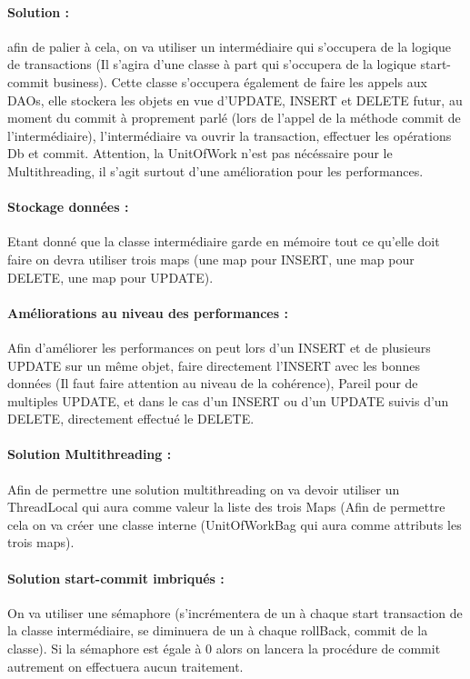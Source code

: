 \documentclass{article}[12pt]
\begin{document}
\paragraph{Solution : } afin de palier à cela, on va utiliser un intermédiaire qui s'occupera de la logique de transactions (Il s'agira d'une classe à part qui s'occupera de la logique start-commit business). Cette classe s'occupera également de faire les appels aux DAOs, elle stockera les objets en vue d'UPDATE, INSERT et DELETE futur, au moment du commit à proprement parlé (lors de l'appel de la méthode commit de l'intermédiaire), l'intermédiaire va ouvrir la transaction, effectuer les opérations Db et commit. Attention, la UnitOfWork n'est pas nécéssaire pour le Multithreading, il s'agit surtout d'une amélioration pour les performances.
\paragraph{Stockage données : } Etant donné que la classe intermédiaire garde en mémoire tout ce qu'elle doit faire on devra utiliser trois maps (une map pour INSERT, une map pour DELETE, une map pour UPDATE). 
\paragraph{Améliorations au niveau des performances :} Afin d'améliorer les performances on peut lors d'un INSERT et de plusieurs UPDATE sur un même objet, faire directement l'INSERT avec les bonnes données (Il faut faire attention au niveau de la cohérence), Pareil pour de multiples UPDATE, et dans le cas d'un INSERT ou d'un UPDATE suivis d'un DELETE, directement effectué le DELETE. 
\paragraph{Solution Multithreading : } Afin de permettre une solution multithreading on va devoir utiliser un ThreadLocal qui aura comme valeur la liste des trois Maps (Afin de permettre cela on va créer une classe interne (UnitOfWorkBag qui aura comme attributs les trois maps). 
\paragraph{Solution start-commit imbriqués : } On va utiliser une sémaphore (s'incrémentera de un à chaque start transaction de la classe intermédiaire, se diminuera de un à chaque rollBack, commit de la classe). Si la sémaphore est égale à 0 alors on lancera la procédure de commit autrement on effectuera aucun traitement. 
\end{document}

